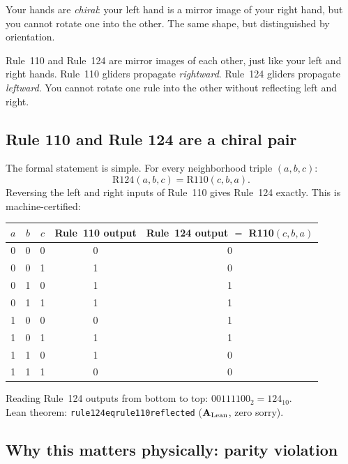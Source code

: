 \documentclass[11pt,a4paper]{article}
\newcommand{\lean}[1]{%
  \penalty-100
  \begingroup\def\_{\textunderscore\allowbreak}\texttt{#1}\endgroup}
\newcommand{\CatAL}{\ensuremath{\mathbf{A}_{\rm Lean}}}
\begin{document}
Your hands are \emph{chiral}: your left hand is a mirror image of your right
hand, but you cannot rotate one into the other.  The same shape, but
distinguished by orientation.

\begin{tcolorbox}[colback=boxpurple,colframe=purple!50!black,
  title=The chirality analogy]
Rule~110 and Rule~124 are mirror images of each other, just like your
left and right hands.  Rule~110 gliders propagate \emph{rightward}.
Rule~124 gliders propagate \emph{leftward}.  You cannot rotate one rule
into the other without reflecting left and right.
\end{tcolorbox}

\subsection{Rule 110 and Rule 124 are a chiral pair}

The formal statement is simple.  For every neighborhood triple $(a, b, c)$:
\[
  \mathrm{R124}(a, b, c) = \mathrm{R110}(c, b, a).
\]
Reversing the left and right inputs of Rule~110 gives Rule~124 exactly.
This is machine-certified:

\begin{center}
\begin{tabular}{ccc|cc}
\toprule
$a$ & $b$ & $c$ & Rule~110 output & Rule~124 output $=$ R110$(c,b,a)$ \\
\midrule
0 & 0 & 0 & 0 & 0 \\
0 & 0 & 1 & 1 & 0 \\
0 & 1 & 0 & 1 & 1 \\
0 & 1 & 1 & 1 & 1 \\
1 & 0 & 0 & 0 & 1 \\
1 & 0 & 1 & 1 & 1 \\
1 & 1 & 0 & 1 & 0 \\
1 & 1 & 1 & 0 & 0 \\
\bottomrule
\end{tabular}
\end{center}

\smallskip
\noindent Reading Rule~124 outputs from bottom to top:
$00111100_2 = 124_{10}$.\\
Lean theorem: \lean{rule124\_eq\_rule110\_reflected} (\CatAL, zero sorry).

\subsection{Why this matters physically: parity violation}
\end{document}
